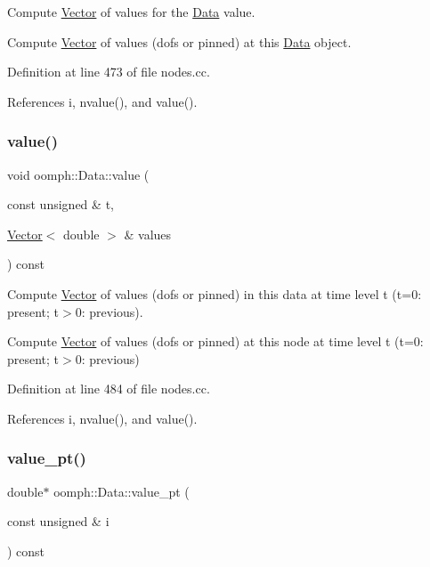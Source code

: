 Compute \hyperlink{classoomph_1_1Vector}{Vector} of values for the \hyperlink{classoomph_1_1Data}{Data} value. 

Compute \hyperlink{classoomph_1_1Vector}{Vector} of values (dofs or pinned) at this \hyperlink{classoomph_1_1Data}{Data} object. 

Definition at line 473 of file nodes.\+cc.



References i, nvalue(), and value().

\mbox{\label{classoomph_1_1Data_a15ab0a61bc348ba1b8b73d096a1bc70f}} 
\subsubsection{\texorpdfstring{value()}{value()}\hspace{0.1cm}{\footnotesize\ttfamily [4/4]}}
{\footnotesize\ttfamily void oomph\+::\+Data\+::value (\begin{DoxyParamCaption}\item[{const unsigned \&}]{t,  }\item[{\hyperlink{classoomph_1_1Vector}{Vector}$<$ double $>$ \&}]{values }\end{DoxyParamCaption}) const}



Compute \hyperlink{classoomph_1_1Vector}{Vector} of values (dofs or pinned) in this data at time level t (t=0\+: present; t$>$0\+: previous). 

Compute \hyperlink{classoomph_1_1Vector}{Vector} of values (dofs or pinned) at this node at time level t (t=0\+: present; t$>$0\+: previous) 

Definition at line 484 of file nodes.\+cc.



References i, nvalue(), and value().

\mbox{\label{classoomph_1_1Data_a559dc196abee87cad34d655c8d6dac1e}} 
\subsubsection{\texorpdfstring{value\+\_\+pt()}{value\_pt()}\hspace{0.1cm}{\footnotesize\ttfamily [1/2]}}
{\footnotesize\ttfamily double$\ast$ oomph\+::\+Data\+::value\+\_\+pt (\begin{DoxyParamCaption}\item[{const unsigned \&}]{i }\end{DoxyParamCaption}) const\hspace{0.3cm}{\ttfamily [inline]}}




